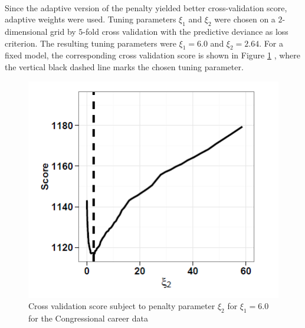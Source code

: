 \documentclass[]{article}
\begin{document}
        \paragraph{} Since the adaptive version of the penalty yielded better cross-validation score, adaptive weights were used. Tuning parameters $\xi_1$ and $\xi_2$ were chosen on a $2$-dimensional grid by $5$-fold cross validation with the predictive deviance as loss criterion. The resulting tuning
        parameters were $\xi_1 = 6.0$ and $\xi_2 = 2.64$. For a fixed model, the corresponding cross validation score is shown in Figure \ref{Figure1}
        , where the vertical black dashed line marks the chosen tuning parameter.
        \begin{figure}[H]
            \centering
            \includegraphics[scale=0.7]{./Figure1.png}
            \caption{Cross validation score subject to penalty parameter $\xi_2$ for $\xi_1 = 6.0$ for the Congressional career data}
            \label{Figure1}
        \end{figure}
\end{document}
